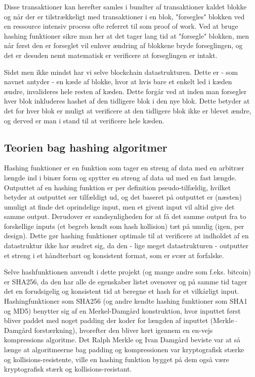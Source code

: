 \documentclass[a4paper, 8pt, oneside]{article} %
\begin{document}
Disse transaktioner kan herefter samles i bundter af transaktioner kaldet blokke og når der er tilstrækkeligt med transaktioner i en blok, "forsegles" blokken ved en ressource intensiv process ofte referret til som proof of work. Ved at bruge hashing funktioner sikre man her at det tager lang tid at "forsegle" blokken, men når først den er forseglet vil enhver ændring af blokkene bryde forseglingen, og det er desuden nemt matematisk er verificere at forseglingen er intakt.

Sidst men ikke mindst har vi selve blockchain datastrukturen. Dette er - som navnet antyder - en kæde af blokke, hvor at hvis bare et enkelt led i kæden ændre, invalideres hele resten af kæden. Dette forgår ved at inden man forsegler hver blok inkluderes hashet af den tidligere blok i den nye blok. Dette betyder at det for hver blok er muligt at verificere at den tidligere blok ikke er blevet ændre, og derved er man i stand til at verificere hele kæden.

\subsection{Teorien bag hashing algoritmer}
Hashing funktioner er en funktion som tager en streng af data med en arbitrær længde ind i binær form og spytter en streng af data ud med en fast længde. Outputtet af en hashing funktion er per definition pseudo-tilfældig, hvilket betyder at outputtet ser tilfældigt ud, og det baseret på outputtet er (næsten) umuligt at finde det oprindelige input, men et givent input vil altid give det samme output. Derudover er sandsynligheden for at få det samme output fra to forskellige inputs (et begreb kendt som hash kollision) tæt på umulig (igen, per design). Dette gør hashing funktioner optimale til at verificere at indholdet af en datastruktur ikke har ændret sig, da den - lige meget datastrukturen - outputter et streng i et håndterbart og konsistent format, som er svær at forfalske.

Selve hashfunktionen anvendt i dette projekt (og mange andre som f.eks. bitcoin) er SHA256, da den har alle de egenskaber listet ovenover og på samme tid tager det en forudsigelig og konsistent tid at beregne et hash for et vilkårligt input. Hashingfunktioner som SHA256 (og andre kendte hashing funktioner som SHA1 og MD5) benytter sig af en Merkel-Damgård konstruktion, hvor inputtet først bliver paddet med noget padding der koder for længden af inputtet (Merkle–Damgård forstærkning), hvorefter den bliver kørt igennem en en-vejs kompressions algoritme. Det Ralph Merkle og Ivan Damgård beviste var at så længe at algoritmeerne bag padding og kompressionen var kryptografisk stærke og kollisions-resistente, ville en hashing funktion bygget på dem også være kryptografisk stærk og kollisions-resistant.
\end{document}
